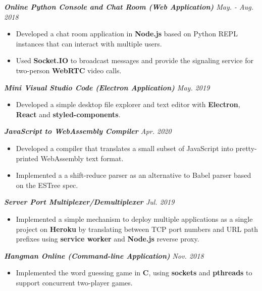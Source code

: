 \documentclass[10pt]{article}
\begin{document}
\vspace{0.5em}
%
{\itshape {\bfseries Online Python Console and Chat Room (Web Application)}  \hfill May. - Aug.  2018}
\begin{itemize}[leftmargin=15pt, noitemsep, topsep=0pt]
\item Developed a chat room application in \textbf{Node.js} based on Python REPL instances that can interact with multiple users.
\item Used \textbf{Socket.IO} to broadcast messages and provide the signaling service for two-person \textbf{WebRTC} video calls.
\end{itemize}
\vspace{0.5em}
%
{\itshape {\bfseries Mini Visual Studio Code (Electron Application)}  \hfill May. 2019}
\begin{itemize}[leftmargin=15pt, noitemsep, topsep=0pt]
\item Developed a simple desktop file explorer and text editor with \textbf{Electron}, \textbf{React} and \textbf{styled-components}.
\end{itemize}
\vspace{0.5em}
%
{\itshape {\bfseries JavaScript to WebAssembly Compiler} \hfill Apr. 2020}
\begin{itemize}[leftmargin=15pt, noitemsep, topsep=0pt]
\item Developed a compiler that translates a small subset of JavaScript into pretty-printed WebAssembly text format.
\item Implemented a a shift-reduce parser as an alternative to Babel parser based on the ESTree spec.
\end{itemize}
\vspace{0.5em}
%
{\itshape {\bfseries Server Port Multiplexer/Demultiplexer}  \hfill Jul. 2019}
\begin{itemize}[leftmargin=15pt, noitemsep, topsep=0pt]
\item Implemented a simple mechanism to deploy multiple applications as a single project on \textbf{Heroku} by translating between TCP port numbers and URL path prefixes using \textbf{service worker} and \textbf{Node.js} reverse proxy.
\end{itemize}
\vspace{0.5em}
%
{\itshape {\bfseries Hangman Online (Command-line Application)} \hfill Nov. 2018}
\begin{itemize}[leftmargin=15pt, noitemsep, topsep=0pt]
\item Implemented the word guessing game in \textbf{C}, using \textbf{sockets} and \textbf{pthreads} to support concurrent two-player games.
\end{itemize}
\end{document}
